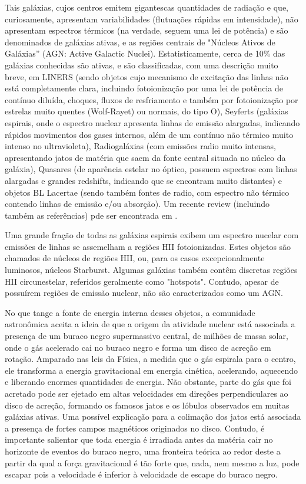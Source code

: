 Tais galáxias, cujos centros emitem gigantescas quantidades de radiação e que, curiosamente, apresentam variabilidades (flutuações rápidas em intensidade), não apresentam espectros térmicos (na verdade, seguem uma lei de potência) e são denominados de galáxias ativas, e as regiões centrais de "Núcleos Ativos de Galáxias” (AGN: Active Galactic Nuclei). Estatisticamente, cerca de 10\%  das galáxias conhecidas são ativas, e são classificadas, com uma descrição muito breve, em LINERS (sendo objetos cujo mecanismo de excitação das linhas não está completamente clara, incluindo fotoionização por uma lei de potência de contínuo diluída, choques, fluxos de resfriamento e também por fotoionização por estrelas muito quentes (Wolf-Rayet) ou normais, do tipo O), Seyferts (galáxias espirais, onde o espectro nuclear apresenta linhas de emissão alargadas, indicando rápidos movimentos dos gases internos, além de um contínuo não térmico muito intenso no ultravioleta), Radiogaláxias (com emissões radio muito intensas, apresentando jatos de matéria que saem da fonte central situada no núcleo da galáxia), Quasares (de aparência estelar no óptico, possuem espectros com linhas alargadas e grandes redshifts, indicando que se encontram muito distantes) e objetos BL Lacertae (sendo também fontes de radio, com espectro não térmico contendo linhas de emissão e/ou absorção). Um recente review (incluindo também as referências) pde ser encontrada em \cite{padovani2017active}.

Uma grande fração de todas as galáxias espirais exibem um espectro nucelar com emissões de linhas se assemelham a regiões HII fotoionizadas. Estes objetos são chamados de núcleos de regiões HII, ou, para os casos excepcionalmente luminosos, núcleos Starburst. Algumas galáxias também contêm discretas regiões HII circunestelar, referidos geralmente como "hotspots". Contudo, apesar de possuírem regiões de emissão nuclear, não são caracterizados como um AGN.

No que tange a fonte de energia interna desses objetos, a comunidade astronômica aceita a ideia de que a origem da atividade nuclear está associada a presença de um buraco negro  supermassivo central, de milhões de massa solar, onde o gás acelerado cai no buraco negro e forma um disco de acreção em rotação. Amparado nas leis da Física, a medida que o gás espirala para o centro, ele transforma a energia gravitacional em energia cinética, acelerando, aquecendo e liberando enormes quantidades de  
energia. Não obstante, parte do gás que foi acretado pode ser ejetado em altas velocidades em direções perpendiculares ao disco de acreção, formando os famosos jatos e os lóbulos observados em muitas galáxias ativas. Uma possível explicação para a colimação dos jatos está associada a presença de fortes campos magnéticos originados no disco. Contudo, é importante salientar que toda energia é irradiada antes da matéria cair no horizonte de eventos do buraco negro, uma fronteira teórica ao redor deste a partir da qual a força gravitacional é tão forte que, nada, nem mesmo a luz, pode escapar pois a velocidade é inferior à velocidade de escape do buraco negro.

